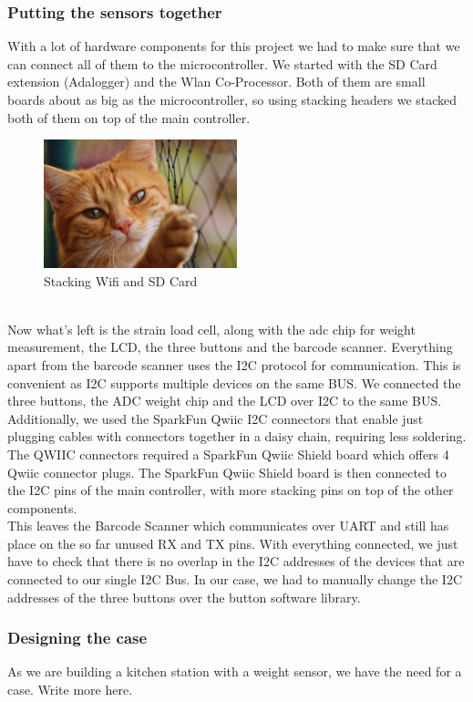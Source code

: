 \documentclass{article}
\begin{document}
\subsubsection{Putting the sensors together}
With a lot of hardware components for this project we had to make sure that we can connect all of them to the microcontroller.
We started with the SD Card extension (Adalogger) and the Wlan Co-Processor. Both of them are small boards about as big as the microcontroller, so using stacking headers we stacked both of them on top of the main controller.\\
\begin{figure}[h]
	\centering
	\includegraphics[width=0.5\textwidth]{cat.jpg}
	\caption{Stacking Wifi and SD Card}
	\label{fig:mesh1}
\end{figure}\\
Now what's left is the strain load cell, along with the adc chip for weight measurement, the LCD, the three buttons and the barcode scanner.
Everything apart from the barcode scanner uses the I2C protocol for communication. This is convenient as I2C supports multiple devices on the same BUS.
We connected the three buttons, the ADC weight chip and the LCD over I2C to the same BUS. Additionally, we used the SparkFun Qwiic I2C connectors that enable just plugging cables with
connectors together in a daisy chain, requiring less soldering. The QWIIC connectors required a SparkFun Qwiic Shield board which offers 4 Qwiic connector plugs.
The SparkFun Qwiic Shield board is then connected to the I2C pins of the main controller, with more stacking pins on top of the other components.\\
This leaves the Barcode Scanner which communicates over UART and still has place on the so far unused RX and TX pins.
With everything connected, we just have to check that there is no overlap in the I2C addresses of the devices that are connected to our single I2C Bus.
In our case, we had to manually change the I2C addresses of the three buttons over the button software library.
\subsubsection{Designing the case}
As we are building a kitchen station with a weight sensor, we have the need for a case.
Write more here.
\end{document}
